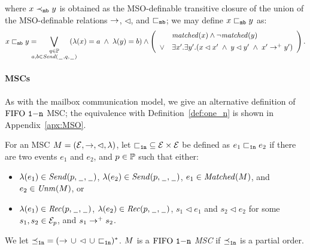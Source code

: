 where $x \mbpartialstrict y$ is obtained as the MSO-definable transitive closure of
the union of the MSO-definable relations $\procrel$, $\lhd$, and $\mbrel$; 
we may define $x \mbrel y$ as:
\[
x \mbrel y =
\displaystyle
\hspace{-1em}\bigvee_{\substack{q \in \Procs\\a,b \in \qsAct{q}}}\hspace{-1em}
(\lambda(x) = a \;\wedge\; \lambda(y) = b)
\wedge
\left(
\begin{array}{rl}
& \mathit{matched}(x) \wedge \neg \mathit{matched}(y)\\[1ex]
\vee & \exists x'.\exists y'. (x \lhd x' \;\wedge\; y \lhd y' \;\wedge\; x' \procrel^+ y')
\end{array}
\right).
\]



\paragraph{\bf \onen MSCs}

As with the mailbox communication model, we give an alternative definition of $\onen$ MSC; the equivalence with Definition~\ref{def:one_n} is shown in Appendix~\ref{apx:MSO}.

\begin{definition} \label{def:one_n_alt}
	For an MSC $\msc = (\Events,\procrel,\lhd,\lambda)$, let ${\onenrel} \subseteq \Events \times \Events$ be defined as $e_1 \onenrel e_2$ if there are two events $e_1$ and $e_2$, and $p \in \Procs$ such that either:
	\begin{itemize}%
		\item $\lambda(e_1) \in \psAct{p}$, $\lambda(e_2) \in \psAct{p}$, $e_1 \in \Matched{\msc}$, and $e_2 \in \Unm{\msc}$, or
		\item $\lambda(e_1) \in \prAct{p}$, $\lambda(e_2) \in \prAct{p}$, $s_1 \lhd e_1$ and $s_2 \lhd e_2$ for some $s_1,s_2 \in \Events_p$, and $s_1 \procrel^+ s_2$.
	\end{itemize}

	We let ${\onenpartial} = ({\procrel} \,\cup\, {\lhd} \,\cup\, {\onenrel})^\ast$.
	$\msc$ is a \emph{$\onen$ MSC}
	if ${\onenpartial}$ is a partial order.
\end{definition}

